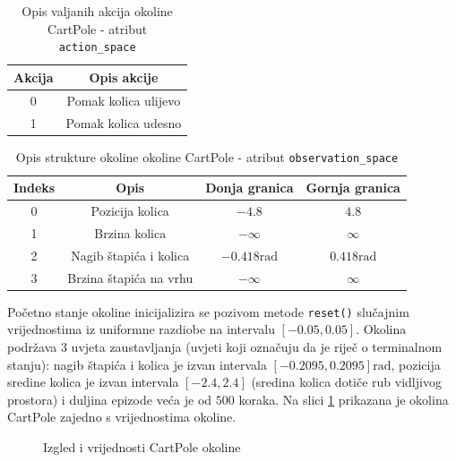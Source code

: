 \begin{table}[ht]
    \centering
    \caption{Opis valjanih akcija okoline CartPole - atribut \texttt{action_space}}
    \begin{tabular}{c c}
        \toprule
        Akcija & Opis akcije  \\
        \midrule
        0 & Pomak kolica ulijevo \\
        1 & Pomak kolica udesno \\
        \bottomrule
    \end{tabular}
    \label{table:cart-pole-action}
\end{table}

\begin{table}[ht]
    \centering
    \caption{Opis strukture okoline okoline CartPole - atribut \texttt{observation_space}}
    \begin{tabular}{c c c c}
        \toprule
        Indeks & Opis & Donja granica & Gornja granica \\
        \midrule
        0 & Pozicija kolica & $-4.8$ & $4.8$ \\
        1 & Brzina kolica & $-\infty$ & $\infty$ \\ 
        2 & Nagib štapića i kolica & $-0.418 \text{rad}$ & $0.418 \text{rad}$ \\
        3 & Brzina štapića na vrhu & $-\infty$ & $\infty$ \\
        \bottomrule
    \end{tabular}
    \label{table:cart-pole-observation}
\end{table}

Početno stanje okoline inicijalizira se pozivom metode \texttt{reset()} slučajnim vrijednostima iz uniformne razdiobe na intervalu $[- 0.05, 0.05]$. Okolina podržava 3 uvjeta zaustavljanja (uvjeti koji označuju da je riječ o terminalnom stanju): nagib štapića i kolica je izvan intervala $[-0.2095, 0.2095] \text{rad}$, pozicija sredine kolica je izvan intervala $[-2.4, 2.4]$ (sredina kolica dotiče rub vidljivog prostora) i duljina epizode veća je od $500$ koraka. Na slici \ref{fig:cart-pole} prikazana je okolina CartPole zajedno s vrijednostima okoline.

\begin{figure}[H]
    \centering
    \caption{Izgled i vrijednosti CartPole okoline \cite{CartPoleValues}}
    \label{fig:cart-pole}
\end{figure}

